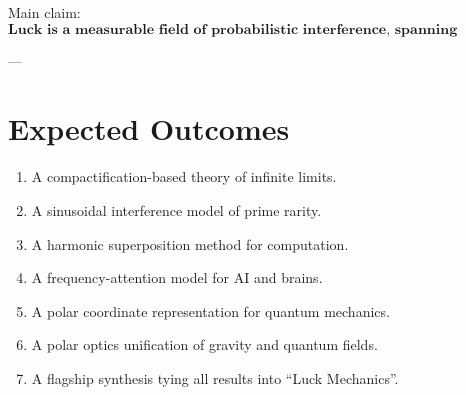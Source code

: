 \documentclass[12pt]{article}
\begin{document}
Main claim:  
\[
\textbf{Luck is a measurable field of probabilistic interference, spanning mathematics, physics, and cognition.}
\]

---

\section{Expected Outcomes}
\begin{enumerate}
    \item A compactification-based theory of infinite limits.  
    \item A sinusoidal interference model of prime rarity.  
    \item A harmonic superposition method for computation.  
    \item A frequency-attention model for AI and brains.  
    \item A polar coordinate representation for quantum mechanics.  
    \item A polar optics unification of gravity and quantum fields.  
    \item A flagship synthesis tying all results into ``Luck Mechanics''.  
\end{enumerate}
\end{document}
